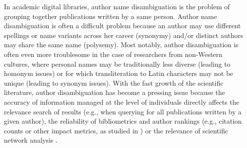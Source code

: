 \documentclass{article}
\begin{document}
In academic digital libraries, author name disambiguation is the problem of
grouping together publications written by a same person.  Author name
disambiguation is often a difficult problem because an author may use different
spellings or name variants across her career (synonymy) and/or distinct authors may
share the same name (polysemy). Most notably, author disambiguation is often even more
troublesome in the case of researchers from non-Western cultures, where
personal names may be traditionally less diverse (leading to homonym issues) or
for which transliteration to Latin characters may not be unique (leading to
synonym issues). With the fast growth of the scientific literature, author
disambiguation has become a pressing issue because the accuracy of information
managed at the level of individuals directly affects the relevance search of
results (e.g., when querying for all publications written by a given author),
the reliability of bibliometrics and author rankings (e.g., citation counts or other impact
metrics, as studied in \citep{strotmann2012author}) or the relevance of scientific network analysis
\citep{newman2001structure}.
\end{document}
